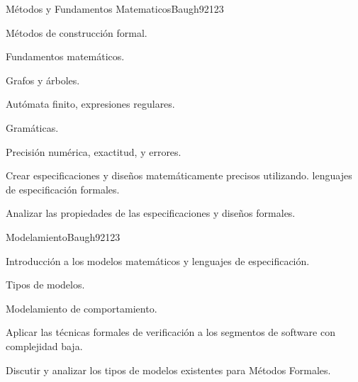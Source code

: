 \begin{syllabus}
\begin{unit}{Métodos y Fundamentos Matematicos}{Baugh92}{12}{3}
\begin{topics}
      \item Métodos de construcción formal.
      \item Fundamentos matemáticos.
      \begin{inparaenum}
         \item Grafos y árboles.
         \item Autómata finito, expresiones regulares.
         \item Gramáticas.
         \item Precisión numérica, exactitud, y errores.
      \end{inparaenum}
   \end{topics}
   \begin{learningoutcomes}
      \item Crear especificaciones y diseños matemáticamente precisos utilizando. lenguajes de especificación formales.
      \item Analizar las propiedades de las especificaciones y diseños formales.
   \end{learningoutcomes}
\end{unit}

\begin{unit}{Modelamiento}{Baugh92}{12}{3}
   \begin{topics}
      \item Introducción a los modelos matemáticos y lenguajes de especificación.
      \item Tipos de modelos.
      \item Modelamiento de comportamiento.
   \end{topics}
   \begin{learningoutcomes}
      \item Aplicar las técnicas formales de verificación a los segmentos de software con complejidad baja.
      \item Discutir y analizar los tipos de modelos existentes para Métodos Formales.
   \end{learningoutcomes}
\end{unit}


\end{syllabus}
